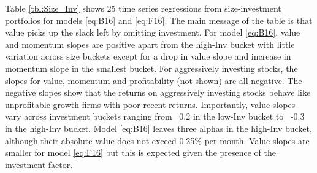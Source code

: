 
Table \ref{tbl:Size_Inv} shows 25 time series regressions from size-investment
portfolios for models \ref{eq:B16} and \ref{eq:F16}.
The main message of the table is that value picks up the slack left by
omitting investment.
For model \ref{eq:B16},
value and momentum slopes are positive apart from the high-Inv bucket
with little variation across size buckets except for a drop in value slope and
increase in momentum slope in the smallest bucket.
For aggressively investing stocks, the slopes for value, momentum and
profitability (not shown) are all negative.
The negative slopes show that the returns on aggressively investing stocks
behave like unprofitable growth firms with poor recent returns.
Importantly, value slopes vary across investment buckets ranging from ~0.2 in
the low-Inv bucket to ~-0.3 in the high-Inv bucket.
Model \ref{eq:B16} leaves three alphas in the high-Inv bucket,
although their absolute value does not exceed 0.25\% per month.
Value slopes are smaller for model \ref{eq:F16} but this is expected given the
presence of the investment factor.
